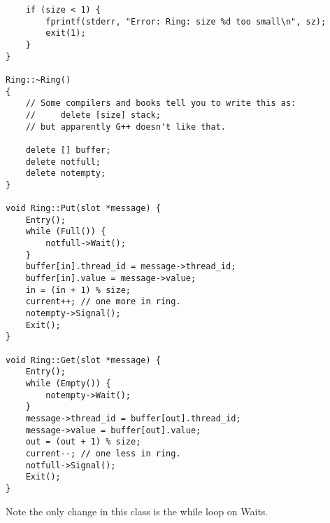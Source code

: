 \documentclass[11pt]{article}
\begin{document}
\begin{question}
\begin{verbatim}
    if (size < 1) {
        fprintf(stderr, "Error: Ring: size %d too small\n", sz);
        exit(1);
    }
}

Ring::~Ring()
{
    // Some compilers and books tell you to write this as:
    //     delete [size] stack;
    // but apparently G++ doesn't like that.

    delete [] buffer;
    delete notfull;
    delete notempty;
}

void Ring::Put(slot *message) {
    Entry();
    while (Full()) {
        notfull->Wait();
    }
    buffer[in].thread_id = message->thread_id;
    buffer[in].value = message->value;
    in = (in + 1) % size;
    current++; // one more in ring.
    notempty->Signal();
    Exit();
}

void Ring::Get(slot *message) {
    Entry();
    while (Empty()) {
        notempty->Wait();
    }
    message->thread_id = buffer[out].thread_id;
    message->value = buffer[out].value;
    out = (out + 1) % size;
    current--; // one less in ring.
    notfull->Signal();
    Exit();
}
    \end{verbatim}

    Note the only change in this class is the while loop on Waits.

\end{question}
\end{document}
